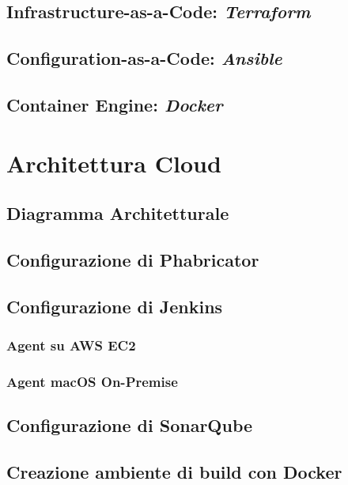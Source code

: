 \documentclass[a4paper,12pt]{report}
\begin{document}
	\section{Infrastructure-as-a-Code: \emph{Terraform}}
	
	\section{Configuration-as-a-Code: \emph{Ansible}}
	
	\section{Container Engine: \emph{Docker}}
	
	\chapter{Architettura Cloud}
	
	\section{Diagramma Architetturale}
	
	\section{Configurazione di Phabricator}
	
	\section{Configurazione di Jenkins}
	
	\subsection{Agent su AWS EC2}
	
	\subsection{Agent macOS On-Premise}
	
	\section{Configurazione di SonarQube}
	
	\section{Creazione ambiente di build con Docker}
	
\end{document}
